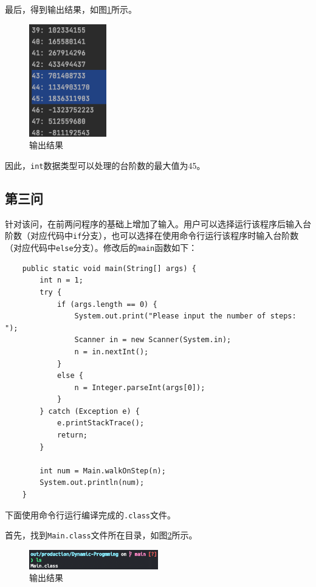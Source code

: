 \documentclass[11pt]{homework}
\begin{document}
最后，得到输出结果，如图\ref{q2_output}所示。
\begin{figure}
  \centering
  \includegraphics[width=0.3\textwidth]{q2_output}
  \caption{输出结果}
  \label{q2_output}
\end{figure}
因此，\verb|int|数据类型可以处理的台阶数的最大值为45。

\subsection*{第三问}
针对该问，在前两问程序的基础上增加了输入。用户可以选择运行该程序后输入台阶数（对应代码中\verb|if|分支），也可以选择在使用命令行运行该程序时输入台阶数（对应代码中\verb|else|分支）。修改后的\verb|main|函数如下：
\lstset{language=java}
  \begin{lstlisting}
    public static void main(String[] args) {
        int n = 1;
        try {
            if (args.length == 0) {
                System.out.print("Please input the number of steps: ");
                Scanner in = new Scanner(System.in);
                n = in.nextInt();
            }
            else {
                n = Integer.parseInt(args[0]);
            }
        } catch (Exception e) {
            e.printStackTrace();
            return;
        }

        int num = Main.walkOnStep(n);
        System.out.println(num);
    }
  \end{lstlisting}

下面使用命令行运行编译完成的\verb|.class|文件。

首先，找到\verb|Main.class|文件所在目录，如图\ref{q3_output_1}所示。
\begin{figure}
  \centering
  \includegraphics[width=0.5\textwidth]{q3_output_1}
  \caption{输出结果}
  \label{q3_output_1}
\end{figure}
\end{document}
